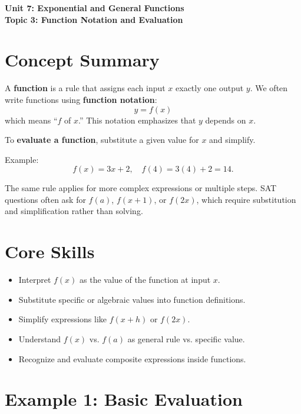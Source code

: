 \documentclass[14pt]{extarticle}
\begin{document}
\raggedright
{}

\begin{center}
    \LARGE \textbf{Unit 7: Exponential and General Functions} \\[6pt]
    \Large \textbf{Topic 3: Function Notation and Evaluation}
\end{center}

\vspace{1em}

\section*{Concept Summary}

A \textbf{function} is a rule that assigns each input \(x\) exactly one output \(y\).  
We often write functions using \textbf{function notation}:
\[
y = f(x)
\]
which means “\(f\) of \(x\).”  
This notation emphasizes that \(y\) depends on \(x\).

To \textbf{evaluate a function}, substitute a given value for \(x\) and simplify.

Example:
\[
f(x) = 3x + 2, \quad f(4) = 3(4) + 2 = 14.
\]

The same rule applies for more complex expressions or multiple steps.  
SAT questions often ask for \(f(a)\), \(f(x+1)\), or \(f(2x)\), which require substitution and simplification rather than solving.

\section*{Core Skills}
\begin{itemize}
  \item Interpret \(f(x)\) as the value of the function at input \(x\).
  \item Substitute specific or algebraic values into function definitions.
  \item Simplify expressions like \(f(x+h)\) or \(f(2x)\).
  \item Understand \(f(x)\) vs. \(f(a)\) as general rule vs. specific value.
  \item Recognize and evaluate composite expressions inside functions.
\end{itemize}

\section*{Example 1: Basic Evaluation}
\end{document}
